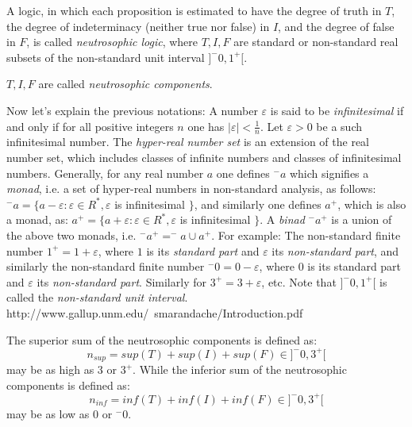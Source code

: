 \documentclass[12pt]{article}
\begin{document}
A logic, in which each proposition is estimated to have the degree of truth in $T$, the degree of indeterminacy (neither true nor false) in $I$, and the degree of false in $F$, is called \emph{neutrosophic logic}, where $T, I, F$ are standard or non-standard real subsets of the non-standard unit interval $]^-0, 1^+[$.

$T, I, F$ are called \emph{neutrosophic components}.

Now let's explain the previous notations:
\newline A number $\varepsilon$ is said to be \emph{infinitesimal} if and only if for all positive integers $n$ one has $|\varepsilon| < \frac{1}{n}$.  Let $\varepsilon > 0$ be a such infinitesimal number.  The \emph{hyper-real number set} is an  extension of the real number set, which includes classes of infinite numbers and classes of infinitesimal numbers.  
\newline Generally, for any real number $a$ one defines $^-a$ which signifies a \emph{monad}, i.e. a set of hyper-real numbers in non-standard analysis, as follows:
\newline $^-a = \{a-\varepsilon: \varepsilon \in R^*, \varepsilon$ is infinitesimal $\}$,
\newline and similarly one defines $a^+$, which is also a monad, as:
\newline $a^+ = \{a+\varepsilon: \varepsilon \in R^*, \varepsilon$ is infinitesimal $\}$.
\newline A \emph{binad} $^-a^+$ is a union of the above two monads, i.e.
\newline $ ^-a^+ = ^-a \cup a^+$.
\newline For example: The non-standard finite number $1^+ = 1+\varepsilon$, where $1$ is its \emph{standard part} and $\varepsilon$ its \emph{non-standard part}, and similarly the non-standard finite number $^-0 = 0-\varepsilon$, where $0$ is its standard part and $\varepsilon$ its \emph{non-standard part}.
\newline Similarly for $3^+ = 3+ \varepsilon$, etc.
\newline Note that $] ^-0, 1^+ [$ is called the \emph{non-standard unit interval}.  
 {http://www.gallup.unm.edu/~smarandache/Introduction.pdf}

The superior sum of the neutrosophic components is defined as:
$$n_{sup} = sup(T) + sup(I) + sup(F) \in ]^-0, 3^+[$$
may be as high as 3 or $3^+$. 
\newline While the inferior sum of the neutrosophic components is defined as:
$$n_{inf} = inf(T) + inf(I) + inf(F) \in ]^-0, 3^+[$$
may be as low as 0 or $^-0$.  
\end{document}
